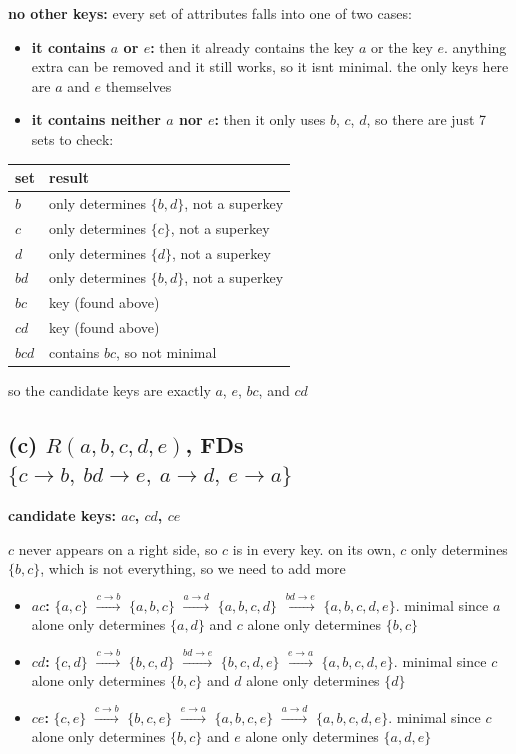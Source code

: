 \documentclass[11pt]{article}
\begin{document}
\noindent\textbf{no other keys:} every set of attributes falls into one of
two cases:
\begin{itemize}
  \item \textbf{it contains $a$ or $e$:} then it already contains the key
    $a$ or the key $e$. anything extra can be removed and it still works, so
    it isnt minimal. the only keys here are $a$ and $e$ themselves
  \item \textbf{it contains neither $a$ nor $e$:} then it only uses $b$,
    $c$, $d$, so there are just 7 sets to check:
\end{itemize}

\begin{center}
\begin{tabular}{ll}
\toprule
set & result \\
\midrule
$b$   & only determines $\{b,d\}$, not a superkey \\
$c$   & only determines $\{c\}$, not a superkey \\
$d$   & only determines $\{d\}$, not a superkey \\
$bd$  & only determines $\{b,d\}$, not a superkey \\
$bc$  & key (found above) \\
$cd$  & key (found above) \\
$bcd$ & contains $bc$, so not minimal \\
\bottomrule
\end{tabular}
\end{center}

\noindent so the candidate keys are exactly $a$,
$e$, $bc$, and $cd$

\subsection*{(c) $R(a,b,c,d,e)$, FDs $\{c \to b,\ bd \to e,\ a \to d,\ e \to a\}$}

\noindent\textbf{candidate keys: $ac$, $cd$, $ce$}

\medskip
\noindent $c$ never appears on a right side, so $c$ is in every key. on
its own, $c$ only determines $\{b,c\}$, which is not everything, so we need
to add more

\begin{itemize}
  \item \textbf{$ac$:} $\{a,c\}$
    $\xrightarrow{c \to b}$ $\{a,b,c\}$
    $\xrightarrow{a \to d}$ $\{a,b,c,d\}$
    $\xrightarrow{bd \to e}$ $\{a,b,c,d,e\}$.
    minimal since $a$ alone only determines $\{a,d\}$ and $c$ alone only
    determines $\{b,c\}$
  \item \textbf{$cd$:} $\{c,d\}$
    $\xrightarrow{c \to b}$ $\{b,c,d\}$
    $\xrightarrow{bd \to e}$ $\{b,c,d,e\}$
    $\xrightarrow{e \to a}$ $\{a,b,c,d,e\}$.
    minimal since $c$ alone only determines $\{b,c\}$ and $d$ alone only
    determines $\{d\}$
  \item \textbf{$ce$:} $\{c,e\}$
    $\xrightarrow{c \to b}$ $\{b,c,e\}$
    $\xrightarrow{e \to a}$ $\{a,b,c,e\}$
    $\xrightarrow{a \to d}$ $\{a,b,c,d,e\}$.
    minimal since $c$ alone only determines $\{b,c\}$ and $e$ alone only
    determines $\{a,d,e\}$
\end{itemize}
\end{document}
